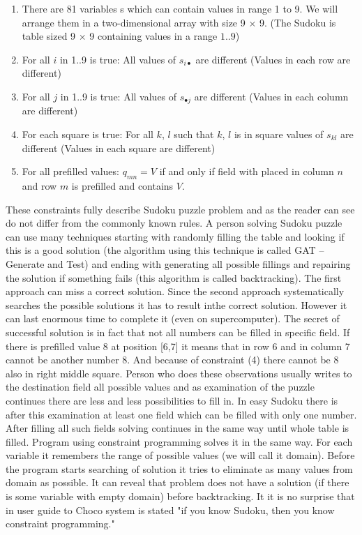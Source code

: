 \begin{enumerate}
\item	There are 81 variables s which can contain values in range 1 to 9. We will 
      arrange them in a two-dimensional array with size 9 $\times$ 9. 
      (The Sudoku is table sized 9 $\times$ 9 containing values in a range $1..9$)
\item	For all $i$ in 1..9 is true: All values of $s_{i \bullet}$ are different 
      (Values in each row are different)
\item	For all $j$ in 1..9 is true: All values of $s_{\bullet j}$ are different 
      (Values in each column are different)
\item	For each square is true: For all $k$, $l$ such that $k$, $l$ is in square values of 
      $s_{kl}$ are different (Values in each square are different)
\item	For all prefilled values: $q_{mn} = V$ if and only if field with placed in column 
      $n$ and row $m$ is prefilled and contains $V$.
\end{enumerate}

These constraints fully describe Sudoku puzzle problem and as the reader can see 
do not differ from the commonly known rules. A person solving Sudoku puzzle can 
use many techniques starting with randomly filling the table and looking if this 
is a good solution (the algorithm using this technique is called GAT -- Generate and Test) 
and ending with generating all possible fillings and repairing the solution if 
something fails (this algorithm is called backtracking). The first approach can miss 
a correct solution. Since the second approach systematically searches the possible 
solutions it has to result inthe correct solution. However it can last enormous 
time to complete it (even on supercomputer). The secret of successful solution 
is in fact that not all numbers can be filled in specific field. If there is 
prefilled value 8 at position [6,7] it means that in row 6 and in column 7 
cannot be another number 8. And because of constraint (4) there cannot be 8 
also in right middle square. Person who does these observations usually writes 
to the destination field all possible values and as examination of the puzzle 
continues there are less and less possibilities to fill in. In easy Sudoku there 
is after this examination at least one field which can be filled with only one 
number. After filling all such fields solving continues in the same way until 
whole table is filled. Program using constraint programming solves it in the same 
way. For each variable it remembers the range of possible values (we will call it 
domain). Before the program starts searching of solution it tries to eliminate as 
many values from domain as possible. It can reveal that problem does not have a 
solution (if there is some variable with empty domain) before backtracking. It 
it is no surprise that in user guide to Choco system is stated "if you know Sudoku, 
then you know constraint programming."

